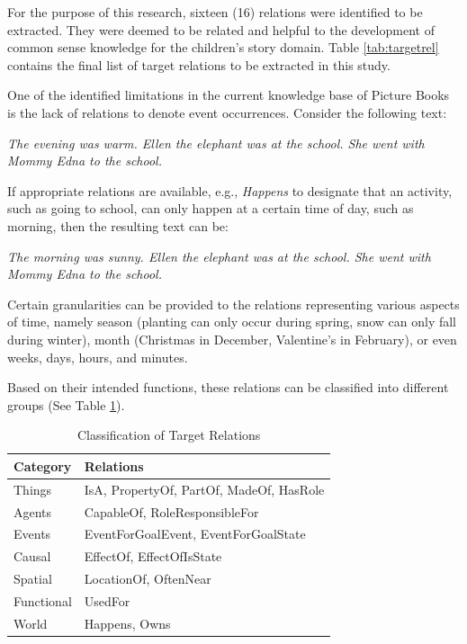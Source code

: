 For the purpose of this research, sixteen (16) relations were identified to be extracted. They were deemed to be related and helpful to the development of common sense knowledge for the children's story domain. Table \ref{tab:targetrel} contains the final list of target relations to be extracted in this study.

One of the identified limitations in the current knowledge base of Picture Books is the lack of relations to denote event occurrences. Consider the following text:
	
	\noindent
	\hspace{1 in}\emph{The evening was warm. Ellen the elephant was at the school. She went with Mommy Edna to the school.}
	
If appropriate relations are available, e.g., \textit{Happens} to designate that an activity, such as going to school, can only happen at a certain time of day, such as morning, then the resulting text can be:
	
	\noindent
	\hspace{1 in}\emph{The morning was sunny. Ellen the elephant was at the school. She went with Mommy Edna to the school.}
	
Certain granularities can be provided to the relations representing various aspects of time, namely season (planting can only occur during spring, snow can only fall during winter), month (Christmas in December, Valentine's in February), or even weeks, days, hours, and minutes.

Based on their intended functions, these relations can be classified into different groups (See Table \ref{tab:classification}). 

\begin{table}[H]   %
\centering
\caption{Classification of Target Relations} \vspace{0.25em}
\begin{tabular}{|p{4cm}|p{6.5cm}|} \hline
\textbf{Category} & \textbf{Relations} \\ \hline
Things		& IsA, PropertyOf, PartOf, MadeOf, HasRole \\ \hline
Agents		& CapableOf, RoleResponsibleFor \\ \hline
Events		& EventForGoalEvent, EventForGoalState \\ \hline
Causal		& EffectOf, EffectOfIsState \\ \hline
Spatial		& LocationOf, OftenNear \\ \hline
Functional	& UsedFor \\ \hline
World		& Happens, Owns \\ \hline
\end{tabular}
\label{tab:classification}
\end{table}

